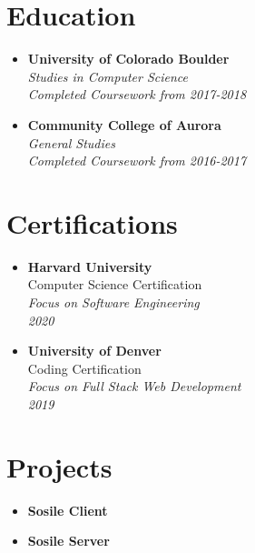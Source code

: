 \documentclass[11pt,oneside,a4paper,titlepage]{article}
\begin{document}
\begin{tcolorbox}
\begin{minipage}[t]{10cm}
\begin{tcolorbox}[grow to right by=1cm,colframe=white,colback=white]
      \section*{Education}
      \begin{itemize}[label={}]
        \item{
            \textbf{University of Colorado Boulder}\\
            \emph{Studies in Computer Science}\\
            \emph{Completed Coursework from 2017-2018}
          }
        \item{
            \textbf{Community College of Aurora}\\
            \emph{General Studies}\\
            \emph{Completed Coursework from 2016-2017}
          }
      \end{itemize}
      \section*{Certifications}
      \begin{itemize}[label={}]
        \item{
            \textbf{Harvard University}\\
            Computer Science Certification\\
            \emph{Focus on Software Engineering}\\
            \emph{2020}
          }
        \item{
            \textbf{University of Denver}\\
            Coding Certification\\
            \emph{Focus on Full Stack Web Development}\\
            \emph{2019}
          }
      \end{itemize}
      \section*{Projects}
      \begin{itemize}[label={}]
        \item{
            \textbf{Sosile Client}
          }
        \item{
            \textbf{Sosile Server}
          }
      \end{itemize}

\end{tcolorbox}
\end{minipage}
\end{tcolorbox}
\end{document}
